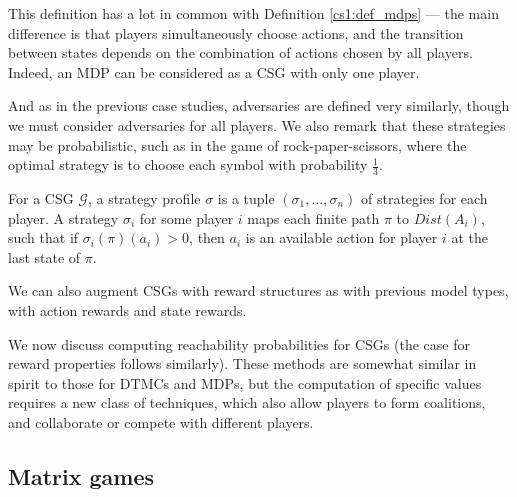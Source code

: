 This definition has a lot in common with Definition \ref{cs1:def_mdps} --- the main difference is that players simultaneously choose actions, and the transition between states depends on the combination of actions chosen by all players. Indeed, an MDP can be considered as a CSG with only one player.




And as in the previous case studies, adversaries are defined very similarly, though we must consider adversaries for all players. We also remark that these strategies may be probabilistic, such as in the game of rock-paper-scissors, where the optimal strategy is to choose each symbol with probability $\frac{1}{3}$.

\begin{definition}
    \label{cs3:csgs_strats}

    For a CSG $\mathcal{G}$, a strategy profile $\sigma$ is a tuple $(\sigma_1, \dots, \sigma_n)$ of strategies for each player. A strategy $\sigma_i$ for some player $i$ maps each finite path $\pi$ to $Dist(A_i)$, such that if $\sigma_i(\pi)(a_i) > 0$, then $a_i$ is an available action for player $i$ at the last state of $\pi$.

\end{definition}

We can also augment CSGs with reward structures as with previous model types, with action rewards and state rewards.

We now discuss computing reachability probabilities for CSGs (the case for reward properties follows similarly). These methods are somewhat similar in spirit to those for DTMCs and MDPs, but the computation of specific values requires a new class of techniques, which also allow players to form coalitions, and collaborate or compete with different players.

\subsection{Matrix games}
\label{cs3:normal_form_matrix}

